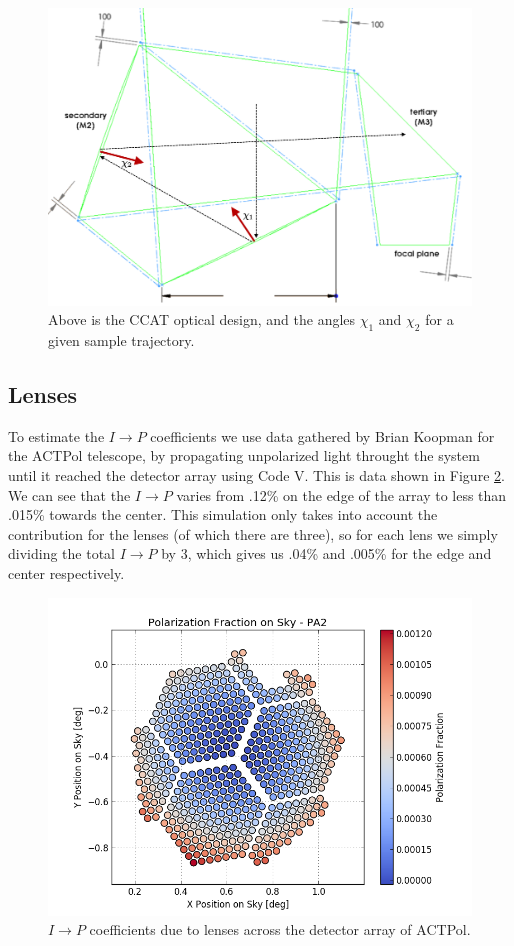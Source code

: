\documentclass{article}
\theoremstyle{remark}
\newcommand{\tab}{\hspace*{2em}}
\newcommand{\ip}{$I\rightarrow P$ }
\begin{document}
\begin{figure}[t!]
	\centering
  \includegraphics[width=.8\linewidth]{IncidentAngles.png}
  \caption{
  Above is the CCAT optical design, and the angles $\chi_1$ and $\chi_2$ for a given sample trajectory.
  }
  \label{fig:IncidentAngles}
\end{figure}

\subsection{Lenses}
\tab To estimate the $I\rightarrow P$ coefficients we use data gathered by Brian Koopman for the ACTPol telescope, by propagating unpolarized light throught the system until it reached the detector array using Code V. 
This is data shown in Figure \ref{fig:IP-array}. 
We can see that the \ip varies from .12\% on the edge of the array to less than .015\% towards the center.
This simulation only takes into account the contribution for the lenses (of which there are three), so for each lens we simply dividing the total \ip by 3, which gives us .04\% and .005\% for the edge and center respectively.

\begin{figure}[t!]
	\centering
  \includegraphics[width=.8\linewidth]{images/pa2_polarization_fraction.png}
  \caption{$I\rightarrow P$ coefficients due to lenses across the detector array of ACTPol.}
  \label{fig:IP-array}
\end{figure}
\end{document}
